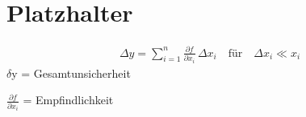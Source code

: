 \documentclass[10pt,a4paper]{article}
\begin{document}
	\pagebreak
	
	
	\section{Platzhalter}
	\begin{mdframed}[style=exercise]
		\begin{align}
			\Delta y = \sum_{i=1}^{n} \frac{\partial f}{\partial x_i} \, \Delta x_i \quad \text{für} \quad \Delta x_i \ll x_i
		\end{align}
		$\delta$y = Gesamtunsicherheit \par
		$\frac{\partial f}{\partial x_i}$ = Empfindlichkeit
	\end{mdframed}
\end{document}
